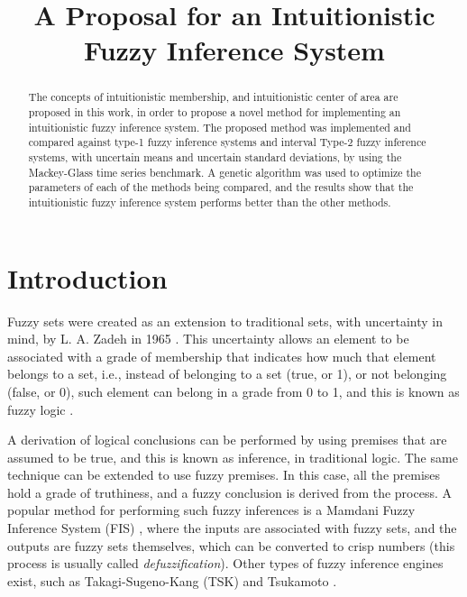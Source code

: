 \documentclass[conference]{IEEEtran}
\begin{document}
\title{A Proposal for an Intuitionistic Fuzzy Inference System}


\author{
  }

\maketitle

\begin{abstract}
The concepts of intuitionistic membership, and intuitionistic center of
area are proposed in this work, in order to propose a novel method for
implementing an intuitionistic fuzzy inference system. The proposed
method was implemented and compared against type-1 fuzzy inference
systems and interval Type-2 fuzzy inference systems, with uncertain
means and uncertain standard deviations, by using the
Mackey-Glass time series benchmark. A genetic algorithm was used to
optimize the parameters of each of the methods being compared, and the
results show that the intuitionistic fuzzy inference system performs
better than the other methods.
\end{abstract}

\IEEEpeerreviewmaketitle



\section{Introduction}

Fuzzy sets were created as an extension to traditional sets, with
uncertainty in mind, by L. A. Zadeh in 1965 \cite{zadeh1965fuzzy}. This uncertainty allows an
element to be associated with a grade of membership that indicates
how much that element belongs to a set, i.e., instead of
belonging to a set (true, or 1), or not belonging (false, or 0),
such element can belong in a grade from 0 to 1, and this is known as
fuzzy logic \cite{klir1995fuzzy}.

A derivation of logical conclusions can be performed by using premises
that are assumed to be true, and this is known as inference, in
traditional logic. The same
technique can be extended to use fuzzy premises. In this case, all the
premises hold a grade of truthiness, and a fuzzy conclusion is derived
from the process. A popular method for performing such fuzzy inferences is a
Mamdani Fuzzy Inference System (FIS) \cite{mamdani1975experiment},
where the inputs are associated with fuzzy sets, and the outputs are
fuzzy sets themselves, which can be converted to crisp numbers
(this process is usually called \textit{defuzzification}). Other types of
fuzzy inference engines exist, such as Takagi-Sugeno-Kang  (TSK)
\cite{takagi1985fuzzy} and Tsukamoto \cite{tsukamoto1979approach}.
\end{document}
